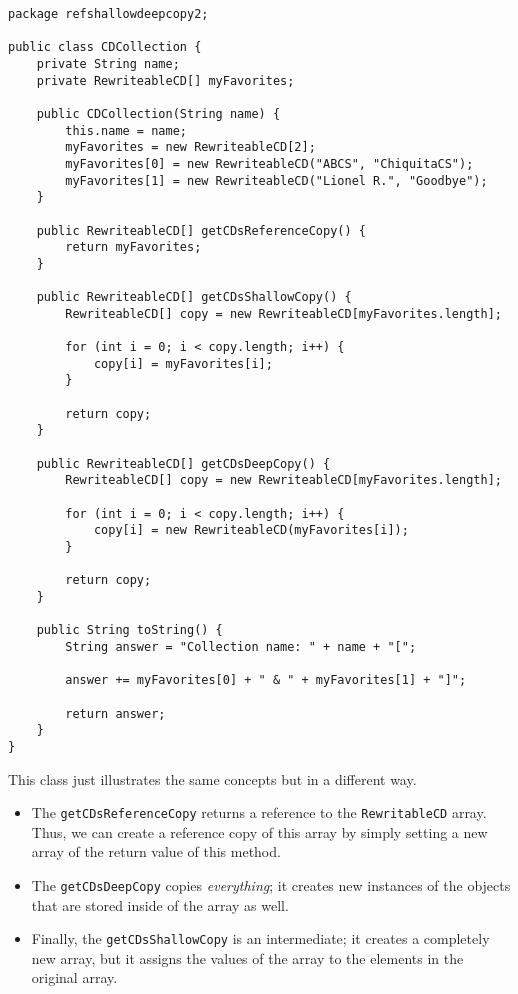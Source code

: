 \begin{lstlisting}
package refshallowdeepcopy2;

public class CDCollection {
	private String name;
	private RewriteableCD[] myFavorites;

	public CDCollection(String name) {
		this.name = name;
		myFavorites = new RewriteableCD[2];
		myFavorites[0] = new RewriteableCD("ABCS", "ChiquitaCS");
		myFavorites[1] = new RewriteableCD("Lionel R.", "Goodbye");
	}

	public RewriteableCD[] getCDsReferenceCopy() {
		return myFavorites;
	}

	public RewriteableCD[] getCDsShallowCopy() {
		RewriteableCD[] copy = new RewriteableCD[myFavorites.length];
		
		for (int i = 0; i < copy.length; i++) {
			copy[i] = myFavorites[i];
		}

		return copy;
	}

	public RewriteableCD[] getCDsDeepCopy() {
		RewriteableCD[] copy = new RewriteableCD[myFavorites.length];
		
		for (int i = 0; i < copy.length; i++) {
			copy[i] = new RewriteableCD(myFavorites[i]);
		}

		return copy;
	}

	public String toString() {
		String answer = "Collection name: " + name + "[";
		
		answer += myFavorites[0] + " & " + myFavorites[1] + "]";
		
		return answer;
	}
}

\end{lstlisting}

This class just illustrates the same concepts but in a different way.

\begin{itemize}
    \item The \verb!getCDsReferenceCopy! returns a reference to the \verb!RewritableCD! array. Thus, we can create a reference copy of this array by simply setting a new array of the return value of this method.
    \item The \verb!getCDsDeepCopy! copies \textit{everything}; it creates new instances of the objects that are stored inside of the array as well.
    \item Finally, the \verb!getCDsShallowCopy! is an intermediate; it creates a completely new array, but it assigns the values of the array to the elements in the original array.
\end{itemize}%